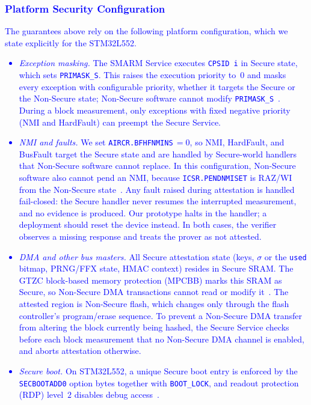 \documentclass[journal]{IEEEtran}
\newcommand\ben[1]{\textcolor{blue}{#1}}
\begin{document}
\subsubsection{\ben{Platform Security Configuration}}
\label{sec:platform-config}
\ben{The guarantees above rely on the following platform configuration, which we state explicitly for the STM32L552.
\begin{itemize}
  \item \emph{Exception masking.} The SMARM Service executes \texttt{CPSID~i} in Secure state, which sets \texttt{PRIMASK\_S}.
  This raises the execution priority to~$0$ and masks every exception with configurable priority, whether it targets the Secure or the Non-Secure state; Non-Secure software cannot modify \texttt{PRIMASK\_S}~\cite{armv8m-arm,pm0264}.
  During a block measurement, only exceptions with fixed negative priority (NMI and HardFault) can preempt the Secure Service.
  \item \emph{NMI and faults.} We set \texttt{AIRCR.BFHFNMINS}$\,=0$, so NMI, HardFault, and BusFault target the Secure state and are handled by Secure-world handlers that Non-Secure software cannot replace.
  In this configuration, Non-Secure software also cannot pend an NMI, because \texttt{ICSR.PENDNMISET} is RAZ/WI from the Non-Secure state~\cite{pm0264}.
  Any fault raised during attestation is handled fail-closed: the Secure handler never resumes the interrupted measurement, and no evidence is produced.
  Our prototype halts in the handler; a deployment should reset the device instead.
  In both cases, the verifier observes a missing response and treats the prover as not attested.
  \item \emph{DMA and other bus masters.} All Secure attestation state (keys, $\sigma$ or the \texttt{used} bitmap, PRNG/FFX state, HMAC context) resides in Secure SRAM.
  The GTZC block-based memory protection (MPCBB) marks this SRAM as Secure, so Non-Secure DMA transactions cannot read or modify it~\cite{an5347,kiri2026vecodi}.
  The attested region is Non-Secure flash, which changes only through the flash controller's program/erase sequence.
  To prevent a Non-Secure DMA transfer from altering the block currently being hashed, the Secure Service checks before each block measurement that no Non-Secure DMA channel is enabled, and aborts attestation otherwise.
  \item \emph{Secure boot.} On STM32L552, a unique Secure boot entry is enforced by the \texttt{SECBOOTADD0} option bytes together with \texttt{BOOT\_LOCK}, and readout protection (RDP) level~$2$ disables debug access~\cite{an5347}.

\end{itemize}}
\end{document}
